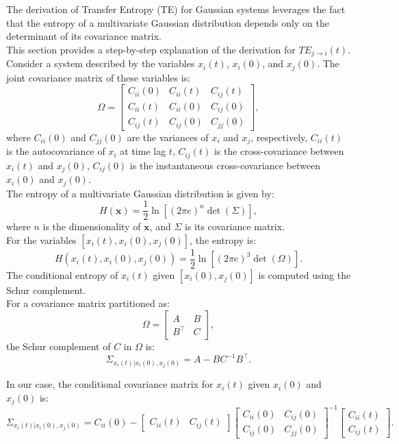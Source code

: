 \documentclass[English, Lau, oneside]{sapthesis}
\begin{document}
The derivation of Transfer Entropy (TE) for Gaussian systems leverages the fact that the entropy of a multivariate Gaussian distribution depends only on the determinant of its covariance matrix.\\
This section provides a step-by-step explanation of the derivation for \( TE_{j \to i}(t) \).\cite{ref13}
Consider a system described by the variables \(x_i(t)\), \(x_i(0)\), and \(x_j(0)\). The joint covariance matrix of these variables is:
\[
\Omega = \begin{bmatrix}
C_{ii}(0) & C_{ii}(t) & C_{ij}(t) \\
C_{ii}(t) & C_{ii}(0) & C_{ij}(0) \\
C_{ij}(t) & C_{ij}(0) & C_{jj}(0)
\end{bmatrix},
\]
where \(C_{ii}(0)\) and \(C_{jj}(0)\) are the variances of \(x_i\) and \(x_j\), respectively, \(C_{ii}(t)\) is the autocovariance of \(x_i\) at time lag \(t\), \(C_{ij}(t)\) is the cross-covariance between \(x_i(t)\) and \(x_j(0)\), \(C_{ij}(0)\) is the instantaneous cross-covariance between \(x_i(0)\) and \(x_j(0)\).\\
The entropy of a multivariate Gaussian distribution is given by:
\[
H(\mathbf{x}) = \frac{1}{2} \ln{[(2\pi e)^n \det(\Sigma)]},
\]
where \(n\) is the dimensionality of \(\mathbf{x}\), and \(\Sigma\) is its covariance matrix.\\
For the variables \([x_i(t), x_i(0), x_j(0)]\), the entropy is:
\[
H(x_i(t), x_i(0), x_j(0)) = \frac{1}{2} \ln{[(2\pi e)^3 \det(\Omega)]}.
\]
The conditional entropy of \(x_i(t)\) given \([x_i(0), x_j(0)]\) is computed using the Schur complement.\\
For a covariance matrix partitioned as:
\[
\Omega = \begin{bmatrix}
A & B \\
B^\top & C
\end{bmatrix},
\]
the Schur complement of \(C\) in \(\Omega\) is:
\[
\Sigma_{x_i(t) | x_i(0), x_j(0)} = A - B C^{-1} B^\top.
\]

In our case, the conditional covariance matrix for \(x_i(t)\) given \(x_i(0)\) and \(x_j(0)\) is:
\[
\Sigma_{x_i(t) | x_i(0), x_j(0)} = C_{ii}(0) - \begin{bmatrix}
C_{ii}(t) & C_{ij}(t)
\end{bmatrix}
\begin{bmatrix}
C_{ii}(0) & C_{ij}(0) \\
C_{ij}(0) & C_{jj}(0)
\end{bmatrix}^{-1}
\begin{bmatrix}
C_{ii}(t) \\
C_{ij}(t)
\end{bmatrix}.
\]
\end{document}
